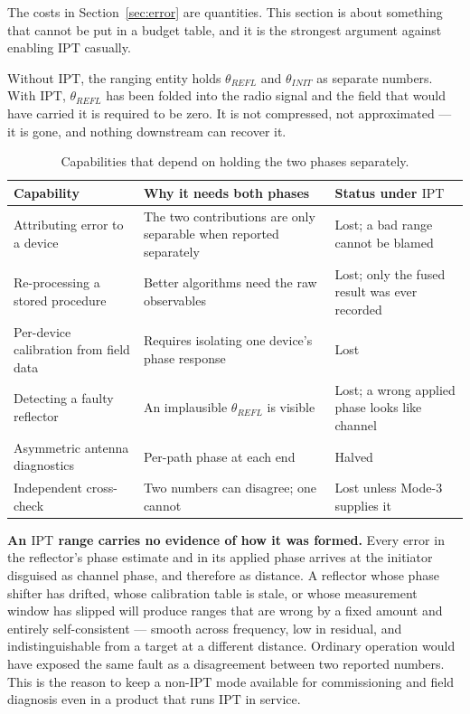 \documentclass[11pt,a4paper]{article}
\newcommand{\IPT}{\ensuremath{\mathrm{IPT}}}
\begin{document}
The costs in Section~\ref{sec:error} are quantities. This section is about something that cannot be
put in a budget table, and it is the strongest argument against enabling \IPT{} casually.

Without \IPT, the ranging entity holds $\theta_{REFL}$ and $\theta_{INIT}$ as separate numbers. With
\IPT, $\theta_{REFL}$ has been folded into the radio signal and the field that would have carried it
is required to be zero. It is not compressed, not approximated --- it is gone, and nothing downstream
can recover it.

\begin{table}[h]
\caption{Capabilities that depend on holding the two phases separately.}
\label{tab:lost}
\centering\small
\begin{tabular}{@{}L{40mm}L{46mm}L{44mm}@{}}
\toprule
Capability & Why it needs both phases & Status under \IPT \\
\midrule
Attributing error to a device & The two contributions are only separable when reported separately & Lost; a bad range cannot be blamed \\
Re-processing a stored procedure & Better algorithms need the raw observables & Lost; only the fused result was ever recorded \\
Per-device calibration from field data & Requires isolating one device's phase response & Lost \\
Detecting a faulty reflector & An implausible $\theta_{REFL}$ is visible & Lost; a wrong applied phase looks like channel \\
Asymmetric antenna diagnostics & Per-path phase at each end & Halved \\
Independent cross-check & Two numbers can disagree; one cannot & Lost unless Mode-3 supplies it \\
\bottomrule
\end{tabular}
\end{table}

\begin{caution}
\textbf{An \IPT{} range carries no evidence of how it was formed.} Every error in the reflector's
phase estimate and in its applied phase arrives at the initiator disguised as channel phase, and
therefore as distance. A reflector whose phase shifter has drifted, whose calibration table is stale,
or whose measurement window has slipped will produce ranges that are wrong by a fixed amount and
entirely self-consistent --- smooth across frequency, low in residual, and indistinguishable from a
target at a different distance. Ordinary operation would have exposed the same fault as a
disagreement between two reported numbers. This is the reason to keep a non-\IPT{} mode available for
commissioning and field diagnosis even in a product that runs \IPT{} in service.
\end{caution}
\end{document}
